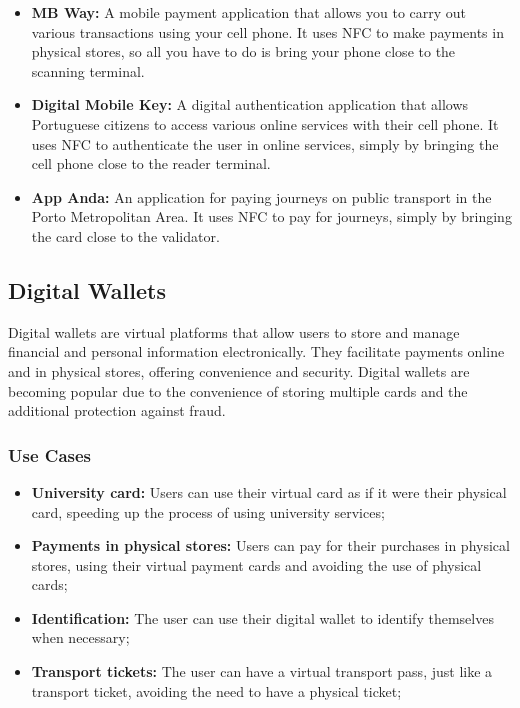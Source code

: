 \documentclass[10pt]{article}
\begin{document}
\begin{itemize}
    \item \textbf{MB Way:} A mobile payment application that allows you to carry out various transactions using your cell phone. It uses NFC to make payments in physical stores, so all you have to do is bring your phone close to the scanning terminal.
    \item \textbf{Digital Mobile Key:} A digital authentication application that allows Portuguese citizens to access various online services with their cell phone. It uses NFC to authenticate the user in online services, simply by bringing the cell phone close to the reader terminal.
    \item \textbf{App Anda:} An application for paying journeys on public transport in the Porto Metropolitan Area. It uses NFC to pay for journeys, simply by bringing the card close to the validator.
\end{itemize}


\subsection{Digital Wallets}

Digital wallets are virtual platforms that allow users to store and manage financial and personal information electronically. They facilitate payments online and in physical stores, offering convenience and security. Digital wallets are becoming popular due to the convenience of storing multiple cards and the additional protection against fraud.

\subsubsection{Use Cases}

\begin{itemize}
    \item \textbf{University card:} Users can use their virtual card as if it were their physical card, speeding up the process of using university services;
    \item \textbf{Payments in physical stores:} Users can pay for their purchases in physical stores, using their virtual payment cards and avoiding the use of physical cards;
    \item \textbf{Identification:} The user can use their digital wallet to identify themselves when necessary;
    \item \textbf{Transport tickets:} The user can have a virtual transport pass, just like a transport ticket, avoiding the need to have a physical ticket;
\end{itemize}
\end{document}
